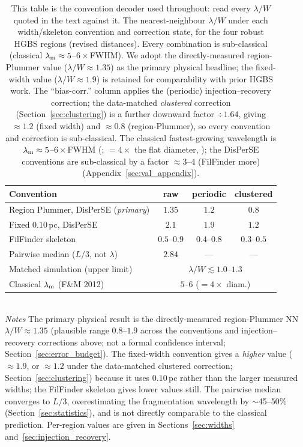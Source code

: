 \documentclass[usenatbib,twoside,twocolumn]{mnras}
\begin{document}
\begin{table}
\caption{This table is the convention decoder used throughout: read every $\lambda/W$ quoted in the text against it. The nearest-neighbour $\lambda/W$ under each width/skeleton convention and correction state, for the four robust HGBS regions (revised distances). Every combination is sub-classical (classical $\lambda_{\rm m}\approx5$--$6\times$FWHM). We adopt the directly-measured region-Plummer value ($\lambda/W\approx1.35$) as the primary physical headline; the fixed-width value ($\lambda/W\approx1.9$) is retained for comparability with prior HGBS work. The ``bias-corr.'' column applies the (periodic) injection--recovery correction; the data-matched \emph{clustered} correction (Section~\ref{sec:clustering}) is a further downward factor $\div1.64$, giving $\approx1.2$ (fixed width) and $\approx0.8$ (region-Plummer), so every convention and correction is sub-classical. The classical fastest-growing wavelength is $\lambda_{\rm m}\approx5$--$6\times$FWHM (\citealt{Fischera2012}; $=4\times$ the flat diameter, \citealt{Inutsuka1992}); the DisPerSE conventions are sub-classical by a factor $\approx3$--$4$ (FilFinder more) (Appendix~\ref{sec:val_appendix}).}
\label{tab:headline}
\footnotesize
\setlength{\tabcolsep}{4pt}
\begin{tabular}{p{3.6cm}ccc}
\toprule
Convention & raw & periodic & clustered \\
\midrule
Region Plummer, DisPerSE (\emph{primary}) & $1.35$ & $1.2$ & $0.8$ \\
Fixed $0.10$\,pc, DisPerSE & $2.1$ & $1.9$ & $1.2$ \\
FilFinder skeleton & $0.5$--$0.9$ & $0.4$--$0.8$ & $0.3$--$0.5$ \\
Pairwise median ($L/3$, not $\lambda$) & $2.84$ & --- & --- \\
\midrule
Matched simulation (upper limit) & \multicolumn{3}{c}{$\lambda/W\lesssim1.0$--$1.3$} \\
Classical $\lambda_{\rm m}$ (F\&M 2012) & \multicolumn{3}{c}{$5$--$6$ ($=4\times$ diam.)} \\
\bottomrule
\end{tabular}
\\[2pt]
\footnotesize
\emph{Notes} The primary physical result is the directly-measured region-Plummer NN $\lambda/W\approx1.35$ (plausible range $0.8$--$1.9$ across the conventions and injection--recovery corrections above; not a formal confidence interval; Section~\ref{sec:error_budget}). The fixed-width convention gives a \emph{higher} value ($\approx1.9$, or $\approx1.2$ under the data-matched clustered correction; Section~\ref{sec:clustering}) because it uses $0.10$\,pc rather than the larger measured widths; the FilFinder skeleton gives lower values still. The pairwise median converges to $L/3$, overestimating the fragmentation wavelength by $\sim$45--50\% (Section~\ref{sec:statistics}), and is not directly comparable to the classical prediction. Per-region values are given in Sections~\ref{sec:widths} and~\ref{sec:injection_recovery}.
\end{table}
\end{document}
